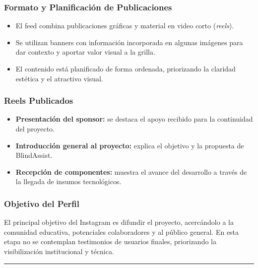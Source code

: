 \documentclass[12pt,a4paper]{article}
\newcommand{\separador}{\vspace{0.5cm}\noindent\rule{\linewidth}{0.5pt}\vspace{0.5cm}}
\begin{document}
\subsubsection{Formato y Planificación de Publicaciones}
\begin{itemize}
    \item El feed combina publicaciones gráficas y material en video corto (\textit{reels}).
    \item Se utilizan banners con información incorporada en algunas imágenes para dar contexto y aportar valor visual a la grilla.
    \item El contenido está planificado de forma ordenada, priorizando la claridad estética y el atractivo visual.
\end{itemize}

\subsubsection{Reels Publicados}
\begin{itemize}
    \item \textbf{Presentación del sponsor:} se destaca el apoyo recibido para la continuidad del proyecto.
    \item \textbf{Introducción general al proyecto:} explica el objetivo y la propuesta de BlindAssist.
    \item \textbf{Recepción de componentes:} muestra el avance del desarrollo a través de la llegada de insumos tecnológicos.
\end{itemize}

\subsubsection{Objetivo del Perfil}
El principal objetivo del Instagram es difundir el proyecto, acercándolo a la comunidad educativa, potenciales colaboradores y al público general.  
En esta etapa no se contemplan testimonios de usuarios finales, priorizando la visibilización institucional y técnica.

\separador
\end{document}
